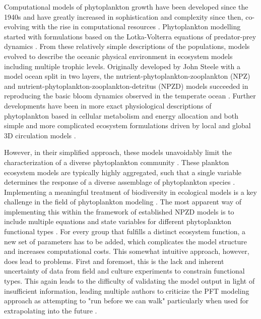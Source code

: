 Computational models of phytoplankton growth have been developed since the 1940s and have greatly increased in sophistication and complexity since then, co-evolving with the rise in computational resources \citep{Gentleman2002a}. Phytoplankton modelling started with formulations based on the Lotka-Volterra equations of predator-prey dynamics \citep{Fleming1939}. From these relatively simple descriptions of the populations, models evolved to describe the oceanic physical environment in ecosystem models including multiple trophic levels. Originally developed by John Steele with a model ocean split in two layers, the nutrient-phytoplankton-zooplankton (NPZ) and nutrient-phytoplankton-zooplankton-detritus (NPZD) models succeeded in reproducing the basic bloom dynamics observed in the temperate ocean \citep{Steele1958,Evans1988,Fasham1990a}. Further developments have been in more exact physiological descriptions of phytoplankton based in cellular metabolism and energy allocation \citep{Geider1997} and both simple and more complicated ecosystem formulations driven by local and global 3D circulation models \citep{Lacroix2007, Hirata2013}.

However, in their simplified approach, these models unavoidably limit the characterization of a diverse phytoplankton community \citep{Bruggeman2009}. These plankton ecosystem models are typically highly aggregated, such that a single variable determines the response of a diverse assemblage of phytoplankton species \citep{Franks2009}. Implementing a meaningful treatment of biodiversity in ecological models is a key challenge in the field of phytoplankton modeling \citep{Queiros2015}. The most apparent way of implementing this within the framework of established NPZD models is to include multiple equations and state variables for different phytoplankton functional types \citep{LeQuere2005}. For every group that fulfills a distinct ecosystem function, a new set of parameters has to be added, which complicates the model structure and increases computational costs. This somewhat intuitive approach, however, does lead to problems. First and foremost, this is the lack and inherent uncertainty of data from field and culture experiments to constrain functional types. This again leads to the difficulty of validating the model output in light of insufficient information, leading multiple authors to criticize the PFT modeling approach as attempting to "run before we can walk" particularly when used for extrapolating into the future \citep{Anderson2005,Shimoda2016}. 

